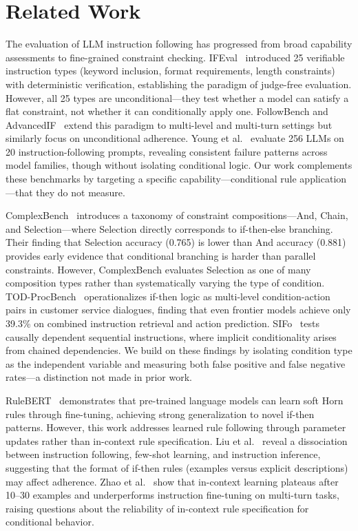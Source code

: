 \section{Related Work}
\label{sec:related}

 The evaluation of LLM instruction following has progressed from broad capability assessments to fine-grained constraint checking. IFEval~\cite{zhou2023ifeval} introduced 25 verifiable instruction types (keyword inclusion, format requirements, length constraints) with deterministic verification, establishing the paradigm of judge-free evaluation. However, all 25 types are unconditional---they test whether a model can satisfy a flat constraint, not whether it can conditionally apply one. FollowBench and AdvancedIF~\cite{he2025advancedif} extend this paradigm to multi-level and multi-turn settings but similarly focus on unconditional adherence. Young et al.~\cite{young2025models} evaluate 256 LLMs on 20 instruction-following prompts, revealing consistent failure patterns across model families, though without isolating conditional logic. Our work complements these benchmarks by targeting a specific capability---conditional rule application---that they do not measure.

 ComplexBench~\cite{wen2024complexbench} introduces a taxonomy of constraint compositions---And, Chain, and Selection---where Selection directly corresponds to if-then-else branching. Their finding that Selection accuracy (0.765) is lower than And accuracy (0.881) provides early evidence that conditional branching is harder than parallel constraints. However, ComplexBench evaluates Selection as one of many composition types rather than systematically varying the type of condition. TOD-ProcBench~\cite{ghazarian2025todprocbench} operationalizes if-then logic as multi-level condition-action pairs in customer service dialogues, finding that even frontier models achieve only 39.3\% on combined instruction retrieval and action prediction. SIFo~\cite{chen2024sifo} tests causally dependent sequential instructions, where implicit conditionality arises from chained dependencies. We build on these findings by isolating condition type as the independent variable and measuring both false positive and false negative rates---a distinction not made in prior work.

 RuleBERT~\cite{saeed2021rulebert} demonstrates that pre-trained language models can learn soft Horn rules through fine-tuning, achieving strong generalization to novel if-then patterns. However, this work addresses learned rule following through parameter updates rather than in-context rule specification. Liu et al.~\cite{liu2024incomplete} reveal a dissociation between instruction following, few-shot learning, and instruction inference, suggesting that the format of if-then rules (examples versus explicit descriptions) may affect adherence. Zhao et al.~\cite{zhao2024icl} show that in-context learning plateaus after 10--30 examples and underperforms instruction fine-tuning on multi-turn tasks, raising questions about the reliability of in-context rule specification for conditional behavior.

